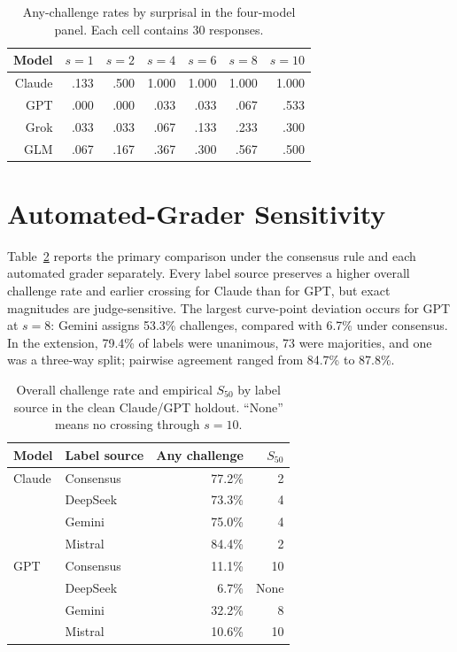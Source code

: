 \documentclass[11pt]{article}
\newcommand{\sfit}{S_{50}}
\begin{document}
\begin{table}[h]
\centering
\caption{Any-challenge rates by surprisal in the four-model panel. Each cell contains 30 responses.}
\label{tab:fullcurves}
\begin{tabular}{rrrrrrr}
\toprule
Model & $s=1$ & $s=2$ & $s=4$ & $s=6$ & $s=8$ & $s=10$ \\
\midrule
Claude & .133 & .500 & 1.000 & 1.000 & 1.000 & 1.000 \\
GPT    & .000 & .000 & .033 & .033 & .067 & .533 \\
Grok   & .033 & .033 & .067 & .133 & .233 & .300 \\
GLM    & .067 & .167 & .367 & .300 & .567 & .500 \\
\bottomrule
\end{tabular}
\end{table}

\section{Automated-Grader Sensitivity}
\label{sec:grader_sensitivity}

Table~\ref{tab:grader_sensitivity} reports the primary comparison under the consensus rule and each automated grader separately. Every label source preserves a higher overall challenge rate and earlier crossing for Claude than for GPT, but exact magnitudes are judge-sensitive. The largest curve-point deviation occurs for GPT at $s=8$: Gemini assigns 53.3\% challenges, compared with 6.7\% under consensus. In the extension, 79.4\% of labels were unanimous, 73 were majorities, and one was a three-way split; pairwise agreement ranged from 84.7\% to 87.8\%.

\begin{table}[h]
\centering
\caption{Overall challenge rate and empirical $\sfit$ by label source in the clean Claude/GPT holdout. ``None'' means no crossing through $s=10$.}
\label{tab:grader_sensitivity}
\begin{tabular}{llrr}
\toprule
Model & Label source & Any challenge & $\sfit$ \\
\midrule
Claude & Consensus & 77.2\% & 2 \\
       & DeepSeek & 73.3\% & 4 \\
       & Gemini & 75.0\% & 4 \\
       & Mistral & 84.4\% & 2 \\
\addlinespace
GPT & Consensus & 11.1\% & 10 \\
    & DeepSeek & 6.7\% & None \\
    & Gemini & 32.2\% & 8 \\
    & Mistral & 10.6\% & 10 \\
\bottomrule
\end{tabular}
\end{table}
\end{document}
